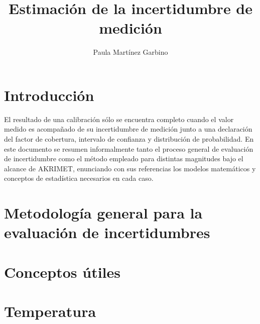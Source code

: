 \documentclass[12pt]{article}
\title{Estimación de la incertidumbre de medición}
\author{Paula Martínez Garbino}
\begin{document}
\maketitle
\section{Introducción}

El resultado de una calibración sólo se encuentra completo cuando el valor medido es acompañado de su incertidumbre de medición junto a una declaración del factor de cobertura, intervalo de confianza y distribución de probabilidad. En este documento se resumen informalmente tanto el proceso general de evaluación de incertidumbre como el método empleado para distintas magnitudes bajo el alcance de AKRIMET, enunciando con sus referencias los modelos matemáticos y conceptos de estadística necesarios en cada caso.\cite{GUM}

\section{Metodología general para la evaluación de incertidumbres}

% 

\section{Conceptos útiles}

% 

\section{Temperatura}\label{sec:temperatura}

% 

% 
% 
\printbibliography{}
\end{document}
